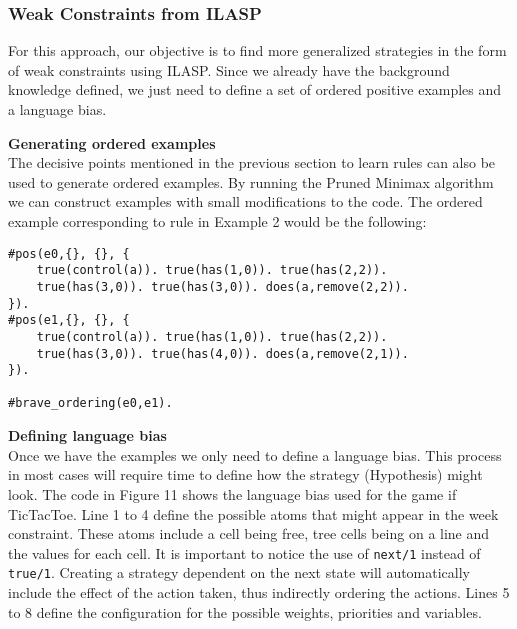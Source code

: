



\subsubsection{Weak Constraints from ILASP}

For this approach, our objective is to find more generalized strategies in the form of weak constraints using ILASP. Since we already have the background knowledge defined, we just need to define a set of ordered positive examples and a language bias. 

\vspace{10px}
\textbf{Generating ordered examples}\\

The decisive points mentioned in the previous section to learn rules can also be used to generate ordered examples. By running the Pruned Minimax algorithm we can construct examples with small modifications to the code. The ordered example corresponding to rule in Example 2 would be the following:

\begin{verbatim}
#pos(e0,{}, {}, {
    true(control(a)). true(has(1,0)). true(has(2,2)). 
    true(has(3,0)). true(has(3,0)). does(a,remove(2,2)). 
}).
#pos(e1,{}, {}, {
    true(control(a)). true(has(1,0)). true(has(2,2)). 
    true(has(3,0)). true(has(4,0)). does(a,remove(2,1)). 
}).

#brave_ordering(e0,e1).
\end{verbatim}

\textbf{Defining language bias}\\


Once we have the examples we only need to define a language bias. This process in most cases will require time to define how the strategy (Hypothesis) might look. The code in Figure 11 shows the language bias used for the game if TicTacToe. Line 1 to 4 define the possible atoms that might appear in the week constraint. These atoms include a cell being free, tree cells being on a line and the values for each cell. It is important to notice the use of \texttt{next/1} instead of \texttt{true/1}. Creating a strategy dependent on the next state will automatically include the effect of the action taken, thus indirectly ordering the actions. Lines 5 to 8 define the configuration for the possible weights, priorities and variables.


